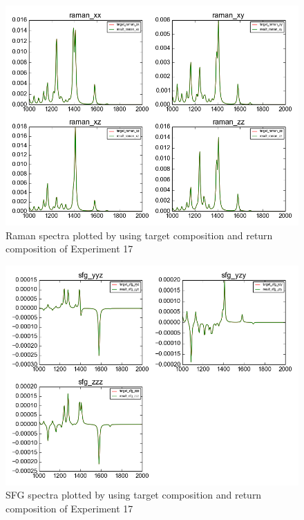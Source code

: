 \begin{figure}[!ht] \label{fig:4.3}
\centering
\includegraphics[scale=0.5]{Figures/chapter4_result_target_plotting_5datapoint_raman.png}
\caption{Raman spectra plotted by using target composition and return composition of Experiment 17} 
\end{figure}

\begin{figure}[!ht] \label{fig:4.4}
\centering
\includegraphics[scale=0.5]{Figures/chapter4_result_target_plotting_5datapoint_sfg.png}
\caption{SFG spectra plotted by using target composition and return composition of Experiment 17} 
\end{figure}

